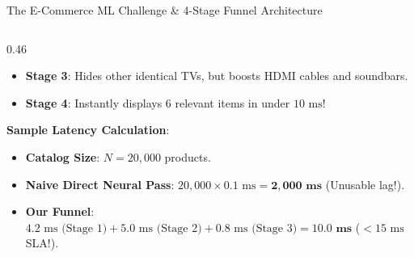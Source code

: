 \documentclass[10pt]{beamer}
\begin{document}
\begin{frame}{The E-Commerce ML Challenge \& 4-Stage Funnel Architecture}
\begin{columns}[T]
\begin{column}{0.46\textwidth}
\begin{itemize}
            \item \textbf{Stage 3}: Hides other identical TVs, but boosts HDMI cables and soundbars.
            \item \textbf{Stage 4}: Instantly displays 6 relevant items in under $10\text{ ms}$!
        \end{itemize}
        {\color{brandorange}\textbf{Sample Latency Calculation}}:
        \begin{itemize}\scriptsize
            \item \textbf{Catalog Size}: $N = 20,000$ products.
            \item \textbf{Naive Direct Neural Pass}: $20,000 \times 0.1\text{ ms} = \mathbf{2,000\text{ ms}}$ (Unusable lag!).
            \item \textbf{Our Funnel}: $4.2\text{ ms (Stage 1)} + 5.0\text{ ms (Stage 2)} + 0.8\text{ ms (Stage 3)} = \mathbf{10.0\text{ ms}}$ ($< 15\text{ ms}$ SLA!).
        \end{itemize}
    \end{column}
\end{columns}
\end{frame}
\end{document}
